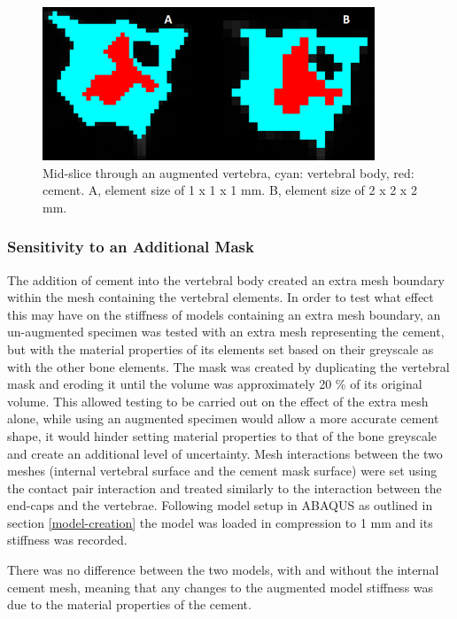 \begin{figure}[ht!]

\centering
\includegraphics[width=3.90994in,height=1.80208in]{images/res_comp.png}
\caption{Mid-slice through an augmented vertebra, cyan: vertebral body, red:
cement. A, element size of 1 x 1 x 1 mm. B, element size of 2 x 2 x
2 mm.}
\label{fig:vertslice}
\end{figure}


\subsubsection{Sensitivity to an Additional
Mask}\label{sensitivity-to-an-additional-mask}

The addition of cement into the vertebral body created an extra mesh boundary
within the mesh containing the vertebral elements. In order to test what effect
this may have on the stiffness of models containing an extra mesh boundary, an
un-augmented specimen was tested with an extra mesh representing the cement,
but with the material properties of its elements set based on their greyscale
as with the other bone elements.  The mask was created by duplicating the
vertebral mask and eroding it until the volume was approximately 20 \% of its
original volume. This allowed testing to be carried out on the effect of the
extra mesh alone, while using an augmented specimen would allow a more accurate
cement shape, it would hinder setting material properties to that of the bone
greyscale and create an additional level of uncertainty. Mesh interactions
between the two meshes (internal vertebral surface and the cement mask surface)
were set using the contact pair interaction and treated similarly to the
interaction between the end-caps and the vertebrae. Following model setup in
ABAQUS as outlined in section \ref{model-creation} the model was loaded in
compression to 1 mm and its stiffness was recorded.

There was no difference between the two models, with and without the internal
cement mesh, meaning that any changes to the augmented model stiffness was due
to the material properties of the cement.

